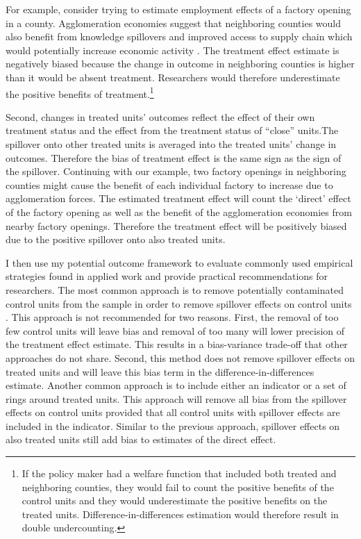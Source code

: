 \documentclass[11pt]{article}
\begin{document}
For example, consider trying to estimate employment effects of a factory opening in a county. Agglomeration economies suggest that neighboring counties would also benefit from knowledge spillovers and improved access to supply chain which would potentially increase economic activity \citep{Duranton_Puga_2003}. The treatment effect estimate is negatively biased because the change in outcome in neighboring counties is higher than it would be absent treatment. Researchers would therefore underestimate the positive benefits of treatment.\footnote{If the policy maker had a welfare function that included both treated and neighboring counties, they would fail to count the positive benefits of the control units and they would underestimate the positive benefits on the treated units. Difference-in-differences estimation would therefore result in double undercounting.}


Second, changes in treated units' outcomes reflect the effect of their own treatment status and the effect from the treatment status of ``close'' units.The spillover onto other treated units is averaged into the treated units' change in outcomes. Therefore the bias of treatment effect is the same sign as the sign of the spillover. Continuing with our example, two factory openings in neighboring counties might cause the benefit of each individual factory to increase due to agglomeration forces. The estimated treatment effect will count the `direct' effect of the factory opening as well as the benefit of the agglomeration economies from nearby factory openings. Therefore the treatment effect will be positively biased due to the positive spillover onto also treated units.

I then use my potential outcome framework to evaluate commonly used empirical strategies found in applied work and provide practical recommendations for researchers. The most common approach is to remove potentially contaminated control units from the sample in order to remove spillover effects on control units \citep{Berg_Streitz_2019}. This approach is not recommended for two reasons. First, the removal of too few control units will leave bias and removal of too many will lower precision of the treatment effect estimate. This results in a bias-variance trade-off that other approaches do not share. Second, this method does not remove spillover effects on treated units and will leave this bias term in the difference-in-differences estimate. Another common approach is to include either an indicator or a set of rings around treated units. This approach will remove all bias from the spillover effects on control units provided that all control units with spillover effects are included in the indicator. Similar to the previous approach, spillover effects on also treated units still add bias to estimates of the direct effect.
\end{document}
